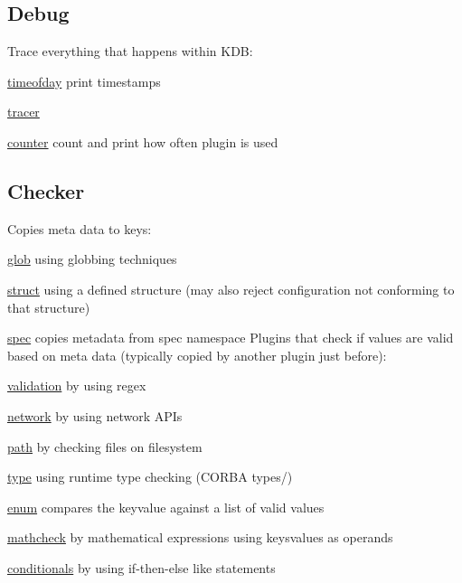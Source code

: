 \subsection*{Debug}

Trace everything that happens within K\+D\+B\+:


\begin{DoxyItemize}
\item \hyperlink{md_src_plugins_timeofday_README_src_plugins_timeofday_README_md}{timeofday} print timestamps
\item \hyperlink{md_src_plugins_tracer_README_src_plugins_tracer_README_md}{tracer}
\item \hyperlink{md_src_plugins_counter_README_src_plugins_counter_README_md}{counter} count and print how often plugin is used
\end{DoxyItemize}

\subsection*{Checker}

Copies meta data to keys\+:


\begin{DoxyItemize}
\item \hyperlink{md_src_plugins_glob_README_src_plugins_glob_README_md}{glob} using globbing techniques
\item \hyperlink{md_src_plugins_struct_README_src_plugins_struct_README_md}{struct} using a defined structure (may also reject configuration not conforming to that structure)
\item \hyperlink{md_src_plugins_spec_README_src_plugins_spec_README_md}{spec} copies metadata from spec namespace Plugins that check if values are valid based on meta data (typically copied by another plugin just before)\+:
\item \hyperlink{md_src_plugins_validation_README_src_plugins_validation_README_md}{validation} by using regex
\item \hyperlink{md_src_plugins_network_README_src_plugins_network_README_md}{network} by using network A\+P\+Is
\item \hyperlink{md_src_plugins_path_README_src_plugins_path_README_md}{path} by checking files on filesystem
\item \hyperlink{md_src_plugins_type_README_src_plugins_type_README_md}{type} using runtime type checking (C\+O\+R\+B\+A types/)
\item \hyperlink{md_src_plugins_enum_README_src_plugins_enum_README_md}{enum} compares the keyvalue against a list of valid values
\item \hyperlink{md_src_plugins_mathcheck_README_src_plugins_mathcheck_README_md}{mathcheck} by mathematical expressions using keysvalues as operands
\item \hyperlink{md_src_plugins_conditionals_README_src_plugins_conditionals_README_md}{conditionals} by using if-\/then-\/else like statements
\end{DoxyItemize}


